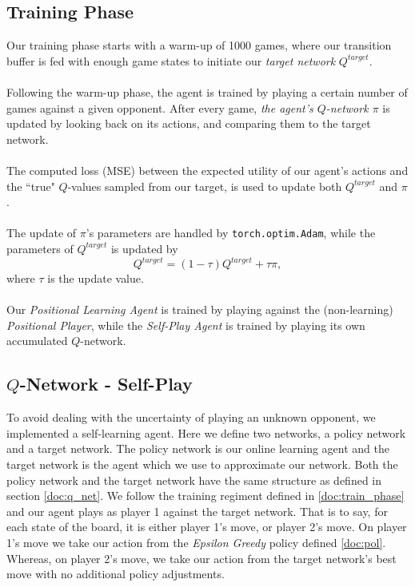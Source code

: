 \documentclass{article}
\begin{document}
\subsection{\label{doc:train_phase}Training Phase}
Our training phase starts with a warm-up of 1000 games, where our transition buffer is fed with enough game states to initiate our \textit{target network} $Q^{target}$.
\\\\
Following the warm-up phase, the agent is trained by playing a certain number of games against a given opponent. After every game,  \textit{the agent's $Q$-network $\pi$} is updated by looking back on its actions, and comparing them to the target network.
\\\\
The computed loss (MSE) between the expected utility of our agent's actions and the ``true" $Q$-values sampled from our target, is used to update both $Q^{target}$ and $\pi$.
\\\\
The update of $\pi$'s parameters are handled by \texttt{torch.optim.Adam}, while the parameters of $Q^{target}$ is updated by
$$Q^{target} = (1-\tau)Q^{target} + \tau\pi,$$ where $\tau$ is the update value.
\\\\
Our \textit{Positional Learning Agent} is trained by playing against the (non-learning) \textit{Positional Player}, while the \textit{Self-Play Agent} is trained by playing its own accumulated $Q$-network.


\subsection{\label{doc:self_play}$Q$-Network - Self-Play}
To avoid dealing with the uncertainty of playing an unknown opponent, we implemented a self-learning agent. Here we define two networks, a policy network and a target network. The policy network is our online learning agent and the target network is the agent which we use to approximate our network. Both the policy network and the target network have the same structure as defined in section \ref{doc:q_net}. We follow the training regiment defined in \ref{doc:train_phase} and our agent plays as player 1 against the target network. That is to say, for each state of the board, it is either player 1's move, or player 2's move. On player 1's move we take our action from the \textit{Epsilon Greedy} policy defined \ref{doc:pol}. Whereas, on player 2's move, we take our action from the target network's best move with no additional policy adjustments.
\end{document}
